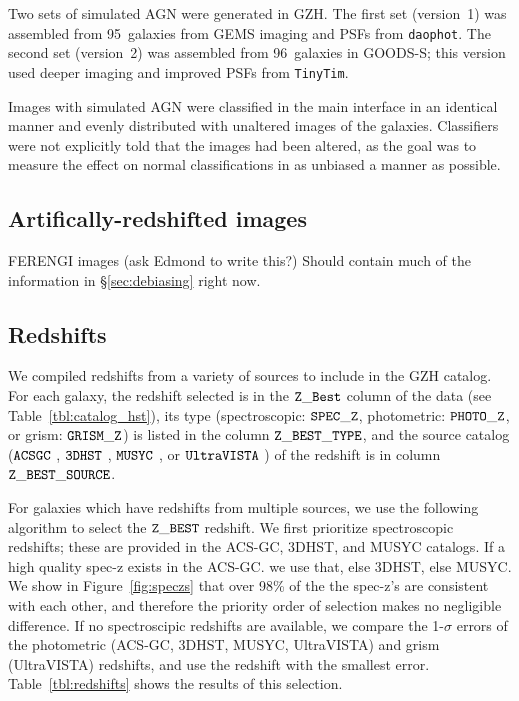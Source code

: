 \documentclass[usenatbib]{mn2e}
\begin{document}
Two sets of simulated AGN were generated in GZH. The first set (version~1) was assembled from 95~galaxies from GEMS imaging and PSFs from \texttt{daophot}. The second set (version~2) was assembled from 96~galaxies in GOODS-S; this version used deeper imaging and improved PSFs from \texttt{TinyTim}. 

Images with simulated AGN were classified in the main interface in an identical manner and evenly distributed with unaltered images of the galaxies. Classifiers were not explicitly told that the images had been altered, as the goal was to measure the effect on normal classifications in as unbiased a manner as possible. 

\subsection{Artifically-redshifted images}

FERENGI images (ask Edmond to write this?) Should contain much of the information in \S\ref{sec:debiasing} right now.

\subsection{Redshifts}

We compiled redshifts from a variety of sources to include in the GZH catalog. For each galaxy, the redshift selected is in the $\tt Z\_Best$ column of the data (see Table~\ref{tbl:catalog_hst}), its type (spectroscopic: $\tt SPEC\_Z$, photometric: $\tt PHOTO\_Z$, or grism: $ \tt GRISM\_Z$) is listed in the column $\tt Z\_BEST\_TYPE$, and the source catalog ($\tt ACSGC$ \citep{gri12}, $\tt 3DHST$ \citep{mom15}, $\tt MUSYC$ \citep{car10}, or $\tt UltraVISTA$ \citep{ilb13}) of the redshift is in column $\tt Z\_BEST\_SOURCE$.

For galaxies which have redshifts from multiple sources, we use the following algorithm to select the $\tt Z\_BEST$ redshift. We first prioritize spectroscopic redshifts; these are provided in the ACS-GC, 3DHST, and MUSYC catalogs. If a high quality spec-z exists in the ACS-GC. we use that, else 3DHST, else MUSYC. We show in Figure~\ref{fig:speczs} that over 98\% of the the spec-z's are consistent with each other, and therefore the priority order of selection makes no negligible difference. If no spectroscipic redshifts are available, we compare the 1-$\sigma$ errors of the photometric (ACS-GC, 3DHST, MUSYC, UltraVISTA) and grism (UltraVISTA) redshifts, and use the redshift with the smallest error. Table~\ref{tbl:redshifts} shows the results of this selection. 
 
\end{document}
